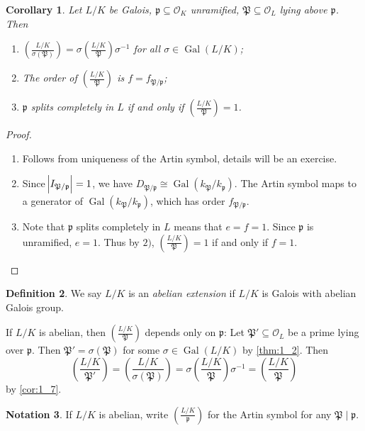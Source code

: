 \documentclass[11pt]{article}
\theoremstyle{definition}
\newtheorem{definition}{Definition}[section]
\newtheorem{notation}[definition]{Notation}
\theoremstyle{plain}
\newtheorem{corollary}[definition]{Corollary}
\theoremstyle{remark}
\DeclareMathOperator{\Gal}{Gal}
\newcommand{\cO}{\mathcal{O}}
\newcommand{\cp}{\mathfrak{P}}
\newcommand{\fp}{\mathfrak{p}}
\newcommand{\leg}[2]{\left(\frac{#1}{#2}\right)}
\begin{document}
\begin{corollary}\label{cor:1_7}
    Let $L/K$ be Galois, $\fp \subseteq \cO_K$ unramified, $\cp \subseteq \cO_L$ lying above $\fp$. Then
    \begin{enumerate}
        \item $\leg{L/K}{\sigma(\cp)} = \sigma \leg{L/K}{\cp} \sigma^{-1}$ for all $\sigma \in \Gal(L/K)$;

        \item The order of $\leg{L/K}{\cp}$ is $f = f_{\cp / \fp}$;

        \item $\fp$ splits completely in $L$ if and only if $\leg{L/K}{\cp} = 1$.
    \end{enumerate}
\end{corollary}
\begin{proof}\phantom{}
    \begin{enumerate}
        \item Follows from uniqueness of the Artin symbol, details will be an exercise.

        \item Since $\abs{I_{\cp / \fp}} = 1$, we have $D_{\cp / \fp} \cong \Gal(k_\cp / k_\fp)$. The Artin symbol maps to a generator of $\Gal(k_\cp / k_\fp)$, which has order $f_{\cp / \fp}$.

        \item Note that $\fp$ splits completely in $L$ means that $e = f = 1$. Since $\fp$ is unramified, $e = 1$. Thus by $2)$, $\leg{L/K}{\cp} = 1$ if and only if $f = 1$. \qedhere
    \end{enumerate}
\end{proof}

\begin{definition}\label{def:1_8}
    We say $L/K$ is an \emph{abelian extension} if $L/K$ is Galois with abelian Galois group.
\end{definition}

If $L/K$ is abelian, then $\leg{L/K}{\cp}$ depends only on $\fp$: Let $\cp' \subseteq \cO_L$ be a prime lying over $\fp$. Then $\cp' = \sigma(\cp)$ for some $\sigma \in \Gal(L/K)$ by \autoref{thm:1_2}. Then
\begin{equation*}
    \leg{L/K}{\cp'} = \leg{L/K}{\sigma(\cp)} = \sigma \leg{L/K}{\cp} \sigma^{-1} = \leg{L/K}{\cp}
\end{equation*}
by \autoref{cor:1_7}.

\begin{notation}\label{not:1_9}
    If $L/K$ is abelian, write $\leg{L/K}{\fp}$ for the Artin symbol for any $\cp \mid \fp$.
\end{notation}
\end{document}
